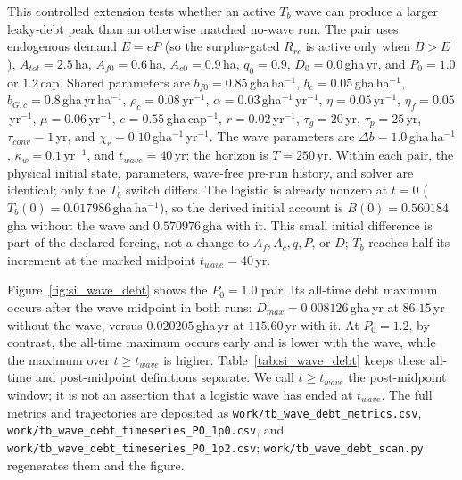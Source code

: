 \documentclass[11pt,a4paper]{article}
\begin{document}
This controlled extension tests whether an active $T_b$ wave can produce a larger leaky-debt peak than an otherwise matched no-wave run. The pair uses endogenous demand $E=eP$ (so the surplus-gated $R_{rc}$ is active only when $B>E$), $A_{tot}=2.5$\,ha, $A_{f0}=0.6$\,ha, $A_{c0}=0.9$\,ha, $q_0=0.9$, $D_0=0.0$\,gha\,yr, and $P_0=1.0$ or $1.2$\,cap. Shared parameters are $b_{f0}=0.85$\,gha\,ha$^{-1}$, $b_c=0.05$\,gha\,ha$^{-1}$, $b_{G,c}=0.8$\,gha\,yr\,ha$^{-1}$, $\rho_c=0.08$\,yr$^{-1}$, $\alpha=0.03$\,gha$^{-1}$\,yr$^{-1}$, $\eta=0.05$\,yr$^{-1}$, $\eta_f=0.05$\,yr$^{-1}$, $\mu=0.06$\,yr$^{-1}$, $e=0.55$\,gha\,cap$^{-1}$, $r=0.02$\,yr$^{-1}$, $\tau_g=20$\,yr, $\tau_p=25$\,yr, $\tau_{conv}=1$\,yr, and $\chi_r=0.10$\,gha$^{-1}$\,yr$^{-1}$. The wave parameters are $\Delta b=1.0$\,gha\,ha$^{-1}$, $\kappa_w=0.1$\,yr$^{-1}$, and $t_{wave}=40$\,yr; the horizon is $T=250$\,yr. Within each pair, the physical initial state, parameters, wave-free pre-run history, and solver are identical; only the $T_b$ switch differs. The logistic is already nonzero at $t=0$ ($T_b(0)=0.017986$\,gha\,ha$^{-1}$), so the derived initial account is $B(0)=0.560184$\,gha without the wave and $0.570976$\,gha with it. This small initial difference is part of the declared forcing, not a change to $A_f,A_c,q,P$, or $D$; $T_b$ reaches half its increment at the marked midpoint $t_{wave}=40$\,yr.

Figure~\ref{fig:si_wave_debt} shows the $P_0=1.0$ pair. Its all-time debt maximum occurs after the wave midpoint in both runs: $D_{max}=0.008126$\,gha\,yr at $86.15$\,yr without the wave, versus $0.020205$\,gha\,yr at $115.60$\,yr with it. At $P_0=1.2$, by contrast, the all-time maximum occurs early and is lower with the wave, while the maximum over $t\ge t_{wave}$ is higher. Table~\ref{tab:si_wave_debt} keeps these all-time and post-midpoint definitions separate. We call $t\ge t_{wave}$ the post-midpoint window; it is not an assertion that a logistic wave has ended at $t_{wave}$. The full metrics and trajectories are deposited as \texttt{work/tb\_wave\_debt\_metrics.csv}, \texttt{work/tb\_wave\_debt\_timeseries\_P0\_1p0.csv}, and \texttt{work/tb\_wave\_debt\_timeseries\_P0\_1p2.csv}; \texttt{work/tb\_wave\_debt\_scan.py} regenerates them and the figure.
\end{document}
